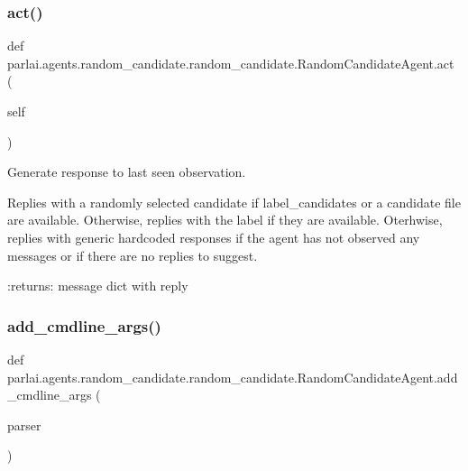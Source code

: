 \subsubsection{\texorpdfstring{act()}{act()}}
{\footnotesize\ttfamily def parlai.\+agents.\+random\+\_\+candidate.\+random\+\_\+candidate.\+Random\+Candidate\+Agent.\+act (\begin{DoxyParamCaption}\item[{}]{self }\end{DoxyParamCaption})}

\begin{DoxyVerb}Generate response to last seen observation.

Replies with a randomly selected candidate if label_candidates or a
candidate file are available.
Otherwise, replies with the label if they are available.
Oterhwise, replies with generic hardcoded responses if the agent has
not observed any messages or if there are no replies to suggest.

:returns: message dict with reply
\end{DoxyVerb}
 \mbox{\label{classparlai_1_1agents_1_1random__candidate_1_1random__candidate_1_1RandomCandidateAgent_adf32b766729393efc5fbdffee363f75a}} 
\subsubsection{\texorpdfstring{add\+\_\+cmdline\+\_\+args()}{add\_cmdline\_args()}}
{\footnotesize\ttfamily def parlai.\+agents.\+random\+\_\+candidate.\+random\+\_\+candidate.\+Random\+Candidate\+Agent.\+add\+\_\+cmdline\+\_\+args (\begin{DoxyParamCaption}\item[{}]{parser }\end{DoxyParamCaption})\hspace{0.3cm}{\ttfamily [static]}}

